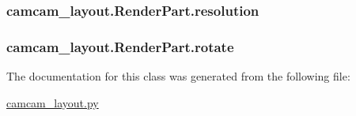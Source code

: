 \subsubsection[{resolution}]{\setlength{\rightskip}{0pt plus 5cm}camcam\+\_\+layout.\+Render\+Part.\+resolution}\label{classcamcam__layout_1_1_render_part_a57c3a35bc7e737e8302024812676496f}
\hypertarget{classcamcam__layout_1_1_render_part_a1903e2c57970fa796187eb102da72f6d}{}
\subsubsection[{rotate}]{\setlength{\rightskip}{0pt plus 5cm}camcam\+\_\+layout.\+Render\+Part.\+rotate}\label{classcamcam__layout_1_1_render_part_a1903e2c57970fa796187eb102da72f6d}


The documentation for this class was generated from the following file\+:\begin{DoxyCompactItemize}
\item 
\hyperlink{camcam__layout_8py}{camcam\+\_\+layout.\+py}\end{DoxyCompactItemize}
